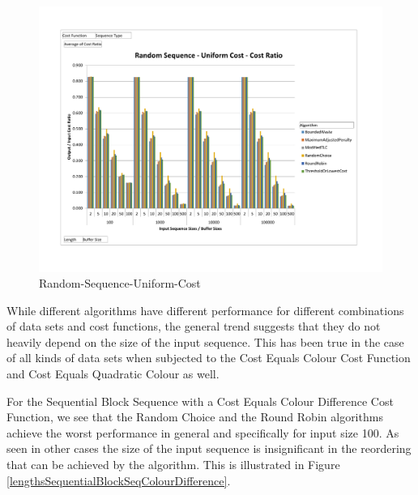 \begin{figure}[ht]
\centering 
\includegraphics[scale=0.60]{Lenghts-Random-Seq-Uniform-Cost.pdf}
\caption{Random-Sequence-Uniform-Cost}
\label{lengthsRandomSeqUniformCost}
\end{figure}

While different algorithms have different performance for different combinations of data sets and cost functions, the general trend suggests that they do not heavily depend on the size of the input sequence. This has been true in the case of all kinds of data sets when subjected to the Cost Equals Colour Cost Function and Cost Equals Quadratic Colour as well. 

For the Sequential Block Sequence with a Cost Equals Colour Difference Cost Function, we see that the Random Choice and the Round Robin algorithms achieve the worst performance in general and specifically for input size 100. As seen in other cases the size of the input sequence is insignificant in the reordering that can be achieved by the algorithm. This is illustrated in Figure \ref{lengthsSequentialBlockSeqColourDifference}. 


